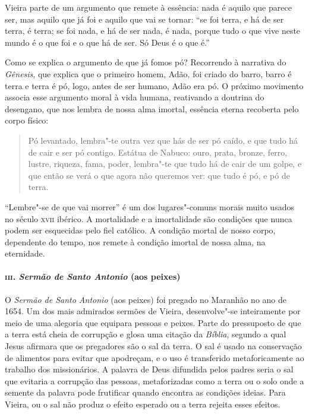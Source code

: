 Vieira parte de um argumento que remete à essência: nada é aquilo que
parece ser, mas aquilo que já foi e aquilo que vai se tornar: ``se foi
terra, e há de ser terra, é terra; se foi nada, e há de ser nada, é
nada, porque tudo o que vive neste mundo é o que foi e o que há de ser.
Só Deus é o que é.''

Como se explica o argumento de que já fomos pó? Recorrendo à narrativa
do \emph{Gênesis}, que explica que o primeiro homem, Adão, foi criado do
barro, barro é terra e terra é pó, logo, antes de ser humano, Adão era
pó. O próximo movimento associa esse argumento moral à vida humana,
reativando a doutrina do desengano, que nos lembra de nossa alma
imortal, essência eterna recoberta pelo corpo físico:

\begin{quote}
Pó levantado, lembra"-te outra vez que hás de ser pó caído, e que tudo
há de cair e ser pó contigo. Estátua de Nabuco: ouro, prata, bronze,
ferro, lustre, riqueza, fama, poder, lembra"-te que tudo há de cair de um
golpe, e que então se verá o que agora não queremos ver: que tudo é pó,
e pó de terra.
\end{quote}

``Lembre"-se de que vai morrer'' é um dos lugares"-comuns morais muito
usados no século \textsc{xvii} ibérico. A mortalidade e a imortalidade são
condições que nunca podem ser esquecidas pelo fiel católico. A condição
mortal de nosso corpo, dependente do tempo, nos remete à condição
imortal de nossa alma, na eternidade.

\paragraph{\textsc{iii}. \emph{Sermão de Santo Antonio} (aos peixes)}

O \emph{Sermão de Santo Antonio} (aos peixes) foi pregado no Maranhão no
ano de 1654. Um dos mais admirados sermões de Vieira, desenvolve"-se
inteiramente por meio de uma alegoria que equipara pessoas e peixes.
Parte do pressuposto de que a terra está cheia de corrupção e glosa uma
citação da \emph{Bíblia}, segundo a qual Jesus afirmara que os
pregadores são o sal da terra. O sal é usado na conservação de alimentos
para evitar que apodreçam, e o uso é transferido metaforicamente ao
trabalho dos missionários. A palavra de Deus difundida pelos padres
seria o sal que evitaria a corrupção das pessoas, metaforizadas como a
terra ou o solo onde a semente da palavra pode frutificar quando
encontra as condições ideias. Para Vieira, ou o sal não produz o efeito
esperado ou a terra rejeita esses efeitos.


